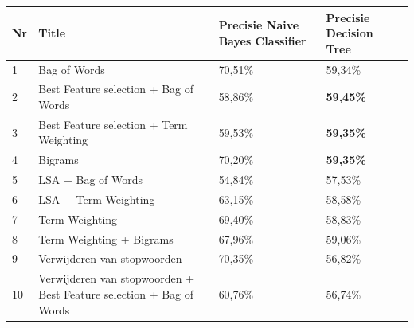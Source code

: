\begin{table}[h]
\centering
\begin{adjustbox}{width=1\textwidth}
\begin{tabular}{|l|l|l|l|}
\hline
{\bf Nr} & {\bf {\bf Title}}                                                                  & {\bf Precisie Naive Bayes Classifier} & {\bf Precisie Decision Tree} \\ \hline
1        & Bag of Words                                                                         & 70,51\%                                 & 59,34\%                        \\ \hline
2        & Best Feature selection + Bag of Words                                                  & 58,86\%                                 & {\bf 59,45\%}                  \\ \hline
3        & Best Feature selection + Term Weighting                                      & 59,53\%                                 & {\bf 59,35\%}                  \\ \hline
4        & Bigrams                                                                   & 70,20\%                                 & {\bf 59,35\%}                  \\ \hline
5        & LSA + Bag of Words                                                                  & 54,84\%                                 & 57,53\%                        \\ \hline
6        & LSA + Term Weighting                                                         & 63,15\%                                 & 58,58\%                        \\ \hline
7        & Term Weighting                                                                       & 69,40\%                                 & 58,83\%                        \\ \hline
8        & Term Weighting + Bigrams                                                             & 67,96\%                                 & 59,06\%                        \\ \hline
9        & Verwijderen van stopwoorden                                                          & 70,35\%                                 & 56,82\%                        \\ \hline
10        & Verwijderen van stopwoorden + Best Feature selection + Bag of Words & 60,76\%                                 & 56,74\%                        \\ \hline

\end{tabular}
\end{adjustbox}
\end{table}
